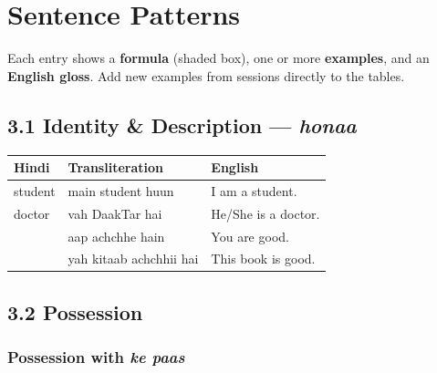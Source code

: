 \section{Sentence Patterns}

Each entry shows a \textbf{formula} (shaded box), one or more \textbf{examples}, and an \textbf{English gloss}.
Add new examples from sessions directly to the tables.


\subsection{3.1 Identity \& Description — \textit{honaa}}


\begin{tabular}{@{}HRG@{}}
  \toprule
  Hindi & Transliteration & English \\
  \midrule
   student        & main student huun      & I am a student. \\
   doctor           & vah DaakTar hai      & He/She is a doctor. \\
            & aap achchhe hain          & You are good. \\
       & yah kitaab achchhii hai   & This book is good. \\
  \bottomrule
\end{tabular}

\subsection{3.2 Possession}

\subsubsection*{Possession with \textit{ke paas}}


